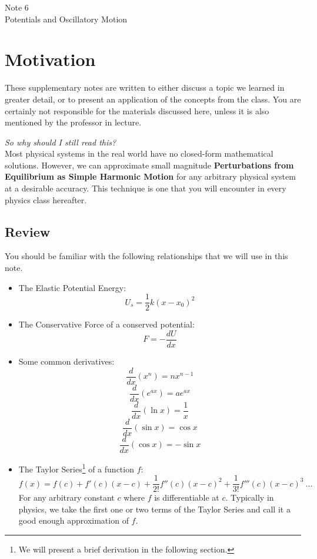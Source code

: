 \documentclass[11pt]{article}
\theoremstyle{gangnamstyle}{\newtheorem{definition}{Definition}[]}
\theoremstyle{gangnamstyle}{\newtheorem{example}{Example}[]}
\theoremstyle{gangnamstyle}{\newtheorem{problem}{Problem}[]}
\theoremstyle{gangnamstyle}{\newtheorem{warning}{Warning}[]}
\begin{document}
\normalfont
\pagestyle{pages}


\begin{center}
\vspace{3in}
{\Large Note 6 } \\[0.05in]
Potentials and Oscillatory Motion \\ [0.5in]
\end{center}


\section*{Motivation}

These supplementary notes are written to either discuss a topic we learned in greater detail, or to present an application of the concepts from the class. You are certainly not responsible for the materials discussed here, unless it is also mentioned by the professor in lecture. 

\textit{So why should I still read this?} \\
Most physical systems in the real world have no closed-form mathematical solutions. However, we can approximate small magnitude \textbf{Perturbations from Equilibrium as Simple Harmonic Motion} for any arbitrary physical system at a desirable accuracy. This technique is one that you will encounter in every physics class hereafter. 

\subsection*{Review}

You should be familiar with the following relationships that we will use in this note. 
\begin{itemize}
\item The Elastic Potential Energy:
\[ U_s = \frac{1}{2}k(x - x_0)^2 \]
\item The Conservative Force of a conserved potential: 
\[ F = - \frac{dU}{dx} \]
\item Some common derivatives: 
\[ \frac{d}{dx}(x^n) = nx^{n - 1} \]
\[ \frac{d}{dx}(e^{ax}) = ae^{ax} \]
\[ \frac{d}{dx}(\ln x) = \frac{1}{x} \]
\[ \frac{d}{dx}(\sin x) = \cos x \]
\[ \frac{d}{dx}(\cos x) = -\sin x \]

\item The Taylor Series\footnote{We will present a brief derivation in the following section.} of a function $f$: 
\[ f(x) = f(c) + f'(c)(x - c) + \frac{1}{2!}f''(c)(x - c)^2 + \frac{1}{3!}f'''(c)(x - c)^3 \ ... \]
For any arbitrary constant $c$ where $f$ is differentiable at $c$. Typically in physics, we take the first one or two terms of the Taylor Series and call it a good enough approximation of $f$. 
\end{itemize}
\end{document}
